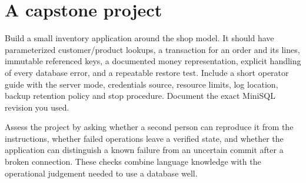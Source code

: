 \section{A capstone project}
Build a small inventory application around the shop model. It should have
parameterized customer/product lookups, a transaction for an order and its
lines, immutable referenced keys, a documented money representation,
explicit handling of every database error, and a repeatable restore test.
Include a short operator guide with the server mode, credentials source,
resource limits, log location, backup retention policy and stop procedure.
Document the exact MiniSQL revision you used.

Assess the project by asking whether a second person can reproduce it from
the instructions, whether failed operations leave a verified state, and
whether the application can distinguish a known failure from an uncertain
commit after a broken connection. These checks combine language knowledge
with the operational judgement needed to use a database well.
